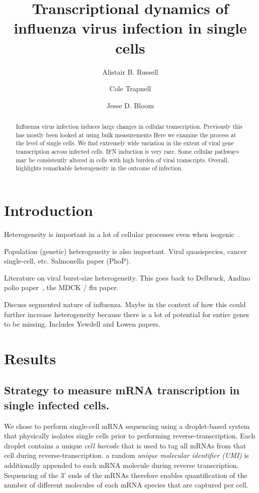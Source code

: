 \documentclass[9pt,lineno]{elife}
\title{Transcriptional dynamics of influenza virus infection in single cells}
\author[1]{Alistair B. Russell}
\author[2]{Cole Trapnell}
\author[1,2*]{Jesse D. Bloom}
\affil[1]{Basic Sciences Division and Computational Biology Program, Fred Hutchinson Cancer Research Center, Seattle, United States}
\affil[2]{Department of Genome Sciences, University of Washington, Seattle, United States}
\begin{document}
\maketitle

\begin{abstract}
Influenza virus infection induces large changes in cellular transcription.
Previously this has mostly been looked at using bulk measurements
Here we examine the process at the level of single cells.
We find extremely wide variation in the extent of viral gene transcription across infected cells.
IFN induction is very rare.
Some cellular pathways may be consistently altered in cells with high burden of viral transcripts.
Overall, highlights remarkable heterogeneity in the outcome of infection.
\end{abstract}


\section{Introduction}

Heterogeneity is important in a lot of cellular processes even when isogenic~\citep{shalek2013single,shalek2014single}.

Population (genetic) heterogeneity is also important. 
Viral quasispecies, cancer single-cell, etc.
Salmonella paper (PhoP).

Literature on viral burst-size heterogeneity.
This goes back to Delbruck, Andino polio paper~\citep{schulte2014single}, the MDCK / flu paper.

Discuss segmented nature of influenza.
Maybe in the context of how this could further increase heterogeneity because there is a lot of potential for entire genes to be missing.
Includes Yewdell and Lowen papers.

\section{Results}

\subsection{Strategy to measure mRNA transcription in single infected cells.}
We chose to perform single-cell mRNA sequencing using a droplet-based system that physically isolates single cells prior to performing reverse-transcription.
Each droplet contains a unique \emph{cell barcode} that is used to tag all mRNAs from that cell during reverse-transcription.
a random \emph{unique molecular identifier (UMI)} is additionally appended to each mRNA molecule during reverse transcription.
Sequencing of the 3' ends of the mRNAs therefore enables quantification of the number of different molecules of each mRNA species that are captured per cell.
\end{document}

